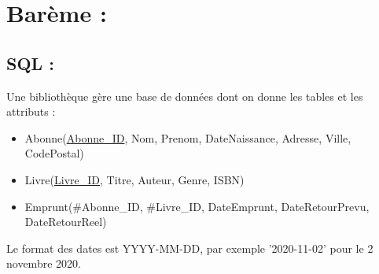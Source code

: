\documentclass[a4paper, noanswers, addpoints, 12pt]{exam}
\begin{document}
\section*{Barème :}
\begin{center}
  \par\bigskip
  \gradetable[h]
\end{center}
\begin{questions}

\section{SQL : }

\question[12] Une bibliothèque gère une base de données dont on donne les tables et les attributs :\\
    \begin{itemize}
        \item \indent Abonne(\underline{Abonne\_ID}, Nom, Prenom, DateNaissance, Adresse, Ville, CodePostal)
        \item \indent Livre(\underline{Livre\_ID}, Titre, Auteur, Genre, ISBN)
        \item \indent Emprunt(\#Abonne\_ID, \#Livre\_ID, DateEmprunt, DateRetourPrevu, DateRetourReel)
    \end{itemize}
\begin{center}

\end{center}
Le format des dates est YYYY-MM-DD, par exemple '2020-11-02' pour le 2 novembre 2020.


\end{questions}
\end{document}
